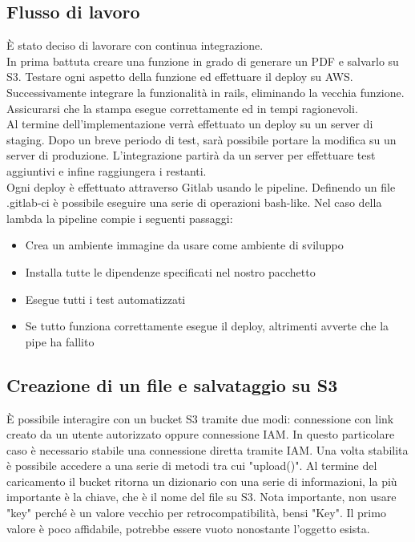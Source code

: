 \documentclass[12pt]{article}
\begin{document}
\subsection{Flusso di lavoro}
È stato deciso di lavorare con continua integrazione. 
\\ In prima battuta creare una funzione in grado di generare un PDF e salvarlo 
su S3. Testare ogni aspetto della funzione ed effettuare il deploy su AWS. 
\\ Successivamente integrare la funzionalità in rails, eliminando la vecchia 
funzione. Assicurarsi che la stampa esegue correttamente ed in tempi ragionevoli.
\\ Al termine dell'implementazione verrà effettuato un deploy su un server 
di staging. Dopo un breve periodo di test, sarà possibile portare la modifica 
su un server di produzione. L'integrazione partirà da un server per effettuare 
test aggiuntivi e infine raggiungera i restanti.
\\ Ogni deploy è effettuato attraverso Gitlab usando le pipeline. 
Definendo un file .gitlab-ci è possibile eseguire una serie di operazioni 
bash-like. 
Nel caso della lambda la pipeline compie i seguenti passaggi: 
\begin{itemize}
  \item Crea un ambiente immagine da usare come ambiente di sviluppo 
  \item Installa tutte le dipendenze specificati nel nostro pacchetto
  \item Esegue tutti i test automatizzati 
  \item Se tutto funziona correttamente esegue il deploy, altrimenti avverte 
  che la pipe ha fallito
\end{itemize}

\subsection{Creazione di un file e salvataggio su S3}
È possibile interagire con un bucket S3 tramite due modi: connessione con link 
creato da un utente autorizzato oppure connessione IAM. In questo particolare 
caso è necessario stabile una connessione diretta tramite IAM. Una volta stabilita 
è possibile accedere a una serie di metodi tra cui "upload()". Al termine del 
caricamento il bucket ritorna un dizionario con una serie di informazioni, la 
più importante è la chiave, che è il nome del file su S3. Nota importante, 
non usare "key" perché è un valore vecchio per retrocompatibilità, bensi "Key". 
Il primo valore è poco affidabile, potrebbe essere vuoto nonostante l'oggetto 
esista.
\end{document}
